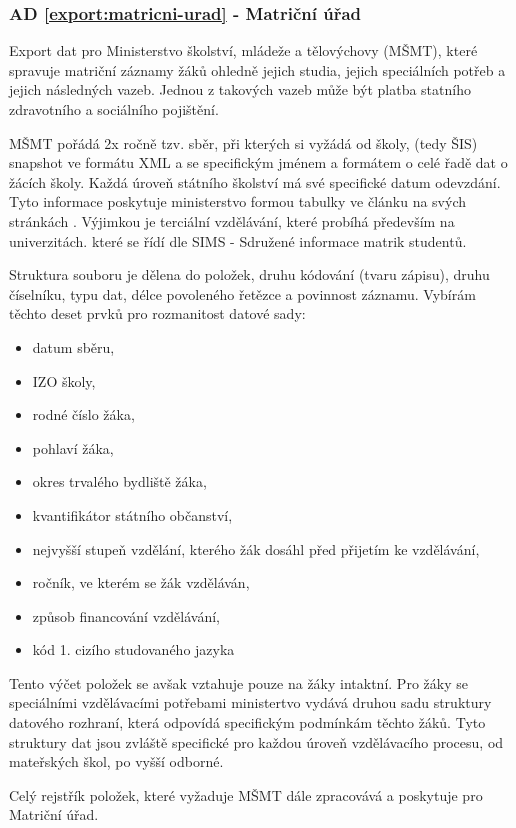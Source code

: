 \documentclass[FM,Proj]{tulthesis}
\begin{document}
\subsubsection*{AD \ref{export:matricni-urad} - Matriční úřad}
Export dat pro Ministerstvo školství, mládeže a tělovýchovy (MŠMT), které spravuje matriční 
záznamy žáků ohledně jejich studia, jejich speciálních potřeb a jejich následných vazeb.
Jednou z takových vazeb může být platba statního zdravotního a sociálního pojištění.

MŠMT pořádá 2x ročně tzv. sběr\cite{skolni-matrika}, při kterých si vyžádá od školy,
(tedy ŠIS) snapshot ve formátu XML a se specifickým jménem a formátem o celé řadě 
dat o žácích školy. Každá úroveň státního školství má své specifické datum odevzdání.
Tyto informace poskytuje ministerstvo formou tabulky ve článku na svých stránkách
\cite{msmt-terminy-predavani-dat-2023}. Výjimkou je terciální vzdělávání, které probíhá
především na univerzitách. které se řídí dle SIMS - Sdružené informace matrik studentů.

Struktura souboru je dělena do položek, druhu kódování (tvaru zápisu),
druhu číselníku, typu dat, délce povoleného řetězce a povinnost záznamu.
Vybírám těchto deset prvků pro rozmanitost datové sady:
\begin{itemize}
    \item datum sběru,
    \item IZO školy,
    \item rodné číslo žáka,
    \item pohlaví žáka,
    \item okres trvalého bydliště žáka,
    \item kvantifikátor státního občanství,
    \item nejvyšší stupeň vzdělání, kterého žák dosáhl před přijetím ke vzdělávání,
    \item ročník, ve kterém se žák vzděláván,
    \item způsob financování vzdělávání,
    \item kód 1. cizího studovaného jazyka
\end{itemize}
Tento výčet položek se avšak vztahuje pouze na žáky intaktní. Pro žáky se speciálními vzdělávacími
potřebami ministertvo vydává druhou sadu struktury datového rozhraní, která odpovídá specifickým
podmínkám těchto žáků. Tyto struktury dat jsou zvláště specifické pro každou úroveň vzdělávacího procesu,
od mateřských škol, po vyšší odborné.

Celý rejstřík položek, které vyžaduje MŠMT dále zpracovává a poskytuje pro Matriční úřad.
\end{document}
